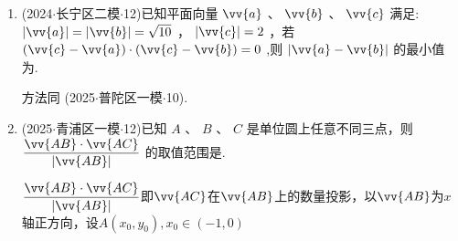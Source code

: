 \begin{enumerate}
\begin{jieda}
        因为$\langle\vv{a}, \vv{b}\rangle < \dfrac{\pi}{2}$，当$\vv{c}$与$\vv{a} + \vv{b}$共线时，两个不等式均取等号，所以$\left|\vv{a}+\vv{b}\right| \leq \sqrt{6}$. 下面尽可能使得$\left|\vv{a}+\vv{b}\right|$更大.
        $\langle\vv{a}, \vv{b}\rangle < \dfrac{\pi}{2}$的情况下已经找到$\left(\vv{a} \cdot  \vv{b}\right)_{max} = \left\{  \begin{array}{ll} m,&1 < m \leq \sqrt{6} - 1 \\  \dfrac{5 - {m}^{2}}{2},&\sqrt{6} - 1 <  m < 2 \end{array}\right.$，故无需考虑$\langle\vv{a}, \vv{b}\rangle\geq \dfrac{\pi}{2}$的情况.
    \end{jieda}

    \item (2024$\cdot$长宁区二模$\cdot$12)已知平面向量 $\vv{a}$ 、 $\vv{b}$ 、 $\vv{c}$ 满足: $\left| \vv{a}\right|  = \left| \vv{b}\right|  = \sqrt{10}$ ， $\left| \vv{c}\right|  = 2$ ，若 $\left( {\vv{c} - \vv{a}}\right) \cdot \left(\vv{c} - \vv{b}\right) = 0$ ,则 $\left| {\vv{a} - \vv{b}}\right|$ 的最小值为.
    \begin{jieda}
        方法同 (2025$\cdot$普陀区一模$\cdot$10).
    \end{jieda}

    \item (2025$\cdot$青浦区一模$\cdot$12)已知 $A$ 、 $B$ 、 $C$ 是单位圆上任意不同三点，则 $\dfrac{\vv{AB} \cdot  \vv{AC}}{\left| \vv{AB}\right| }$ 的取值范围是.
    \begin{jieda}
        $\dfrac{\vv{AB} \cdot  \vv{AC}}{\left| \vv{AB}\right| }$即$\vv{AC}$在$\vv{AB}$上的数量投影，以$\vv{AB}$为$x$轴正方向，设$A(x_0, y_0), x_0 \in (-1, 0)$
        

\end{jieda}
\end{enumerate}

